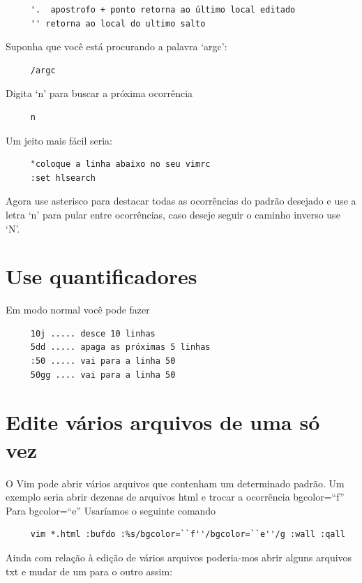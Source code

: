 \documentclass[10pt,a4paper,openany]{book}
\begin{document}
\begin{verbatim}
     '.  apostrofo + ponto retorna ao último local editado
     '' retorna ao local do ultimo salto
\end{verbatim}

Suponha que você está procurando a palavra `argc':

\begin{verbatim}
     /argc
\end{verbatim}

Digita `n' para buscar a próxima ocorrência

\begin{verbatim}
     n
\end{verbatim}

Um jeito mais fácil seria:

\begin{verbatim}
     "coloque a linha abaixo no seu vimrc
     :set hlsearch
\end{verbatim}

Agora use asterisco para destacar todas as ocorrências do padrão desejado
e use a letra `n' para pular entre ocorrências, caso deseje seguir o caminho
inverso use `N'.

\section{Use quantificadores}
\label{Use quantificadores}
Em modo normal você pode fazer

\begin{verbatim}
     10j ..... desce 10 linhas
     5dd ..... apaga as próximas 5 linhas
     :50 ..... vai para a linha 50
     50gg .... vai para a linha 50
\end{verbatim}


\section{Edite vários arquivos de uma só vez }
\label{Edite vários arquivos de uma só vez }

O Vim pode abrir vários arquivos que contenham um determinado padrão.
Um exemplo seria abrir dezenas de arquivos html e trocar a ocorrência
bgcolor=``f'' Para bgcolor=``e'' Usaríamos o seguinte comando

\begin{verbatim}
     vim *.html :bufdo :%s/bgcolor=``f''/bgcolor=``e''/g :wall :qall
\end{verbatim}

Ainda com relação à edição de vários arquivos poderia-mos abrir alguns
arquivos txt e mudar de um para o outro assim:
\end{document}
